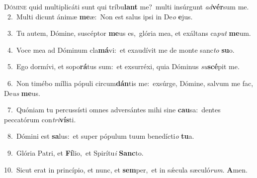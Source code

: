 \lettrine{\initial\textcolor{\initialcolor}{D}}{ómine} quid multiplicáti sunt qui tríbu\textbf{lant} me?~\star multi insúrgunt \textit{ad}\-\textbf{vér}sum me.\\
{\numbfont\textcolor{\numbcolor}{~2.}}~Multi dicunt ánimæ \textbf{me}\-æ:~\star Non est salus ipsi in De\textit{o} \textbf{e}\-jus.\par
{\numbfont\textcolor{\numbcolor}{~3.}}~Tu autem, Dómine, suscéptor \textbf{me}\-us es,~\star glória mea, et exáltans ca\textit{put} \textbf{me}\-um.\par
{\numbfont\textcolor{\numbcolor}{~4.}}~Voce mea ad Dóminum cla\-\textbf{má}\-vi:~\star et exaudívit me de monte sanc\textit{to} \textbf{su}\-o.\par
{\numbfont\textcolor{\numbcolor}{~5.}}~Ego dormívi, et sopo\-\textbf{rá}\-tus sum:~\star et exsurréxi, quia Dóminus \textit{su}\-\textbf{scé}pit me.\par
{\numbfont\textcolor{\numbcolor}{~6.}}~Non timébo míllia pópuli circum\-\textbf{dán}\-tis me:~\star exsúrge, Dómine, salvum me fac, De\textit{us} \textbf{me}\-us.\par
{\numbfont\textcolor{\numbcolor}{~7.}}~Quóniam tu percussísti omnes adversántes mihi sine \textbf{cau}\-sa:~\star dentes peccatórum con\-\textit{tri}\-\textbf{vís}ti.\par
{\numbfont\textcolor{\numbcolor}{~8.}}~Dómini est \textbf{sa}\-lus:~\star et super pópulum tuum benedícti\textit{o} \textbf{tu}\-a.\par
{\numbfont\textcolor{\numbcolor}{~9.}}~Glória Patri, et \textbf{Fí}\-lio,~\star et Spirítu\textit{i} \textbf{Sanc}\-to.\par
{\numbfont\textcolor{\numbcolor}{10.}}~Sicut erat in princípio, et nunc, et \textbf{sem}\-per,~\star et in sǽcula sæculó\-\textit{rum}\-. \textbf{A}\-men.\par
